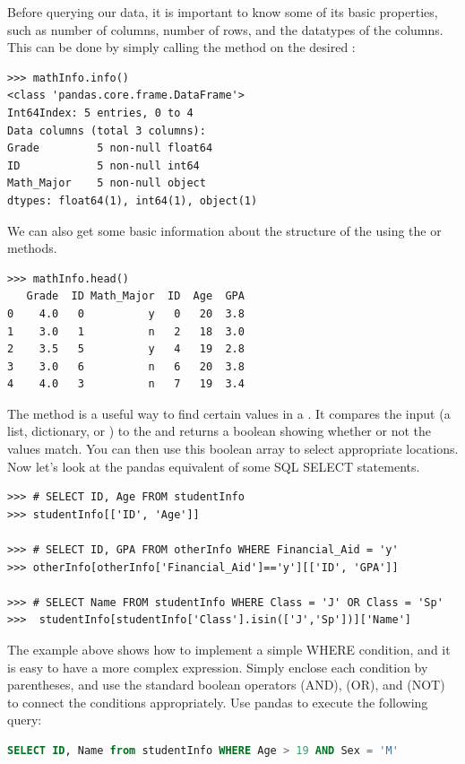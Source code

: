 Before querying our data, it is important to know some of its basic properties,
such as number of columns, number of rows, and the datatypes of the columns.
This can be done by simply calling the  method on the desired
:

\begin{lstlisting}
>>> mathInfo.info()
<class 'pandas.core.frame.DataFrame'>
Int64Index: 5 entries, 0 to 4
Data columns (total 3 columns):
Grade         5 non-null float64
ID            5 non-null int64
Math_Major    5 non-null object
dtypes: float64(1), int64(1), object(1)
\end{lstlisting}

We can also get some basic information about the structure of the 
using the  or  methods.

\begin{lstlisting}
>>> mathInfo.head()
   Grade  ID Math_Major  ID  Age  GPA
0    4.0   0          y   0   20  3.8
1    3.0   1          n   2   18  3.0
2    3.5   5          y   4   19  2.8
3    3.0   6          n   6   20  3.8
4    4.0   3          n   7   19  3.4
\end{lstlisting}

The method  is a useful way to find certain values in a
.  It compares the input (a list, dictionary, or )
to the  and returns a boolean  showing whether or
not the values match. You can then use this boolean array to select appropriate
locations. Now let's look at the pandas equivalent of some SQL SELECT statements.
\begin{lstlisting}
>>> # SELECT ID, Age FROM studentInfo
>>> studentInfo[['ID', 'Age']]

>>> # SELECT ID, GPA FROM otherInfo WHERE Financial_Aid = 'y'
>>> otherInfo[otherInfo['Financial_Aid']=='y'][['ID', 'GPA']]

>>> # SELECT Name FROM studentInfo WHERE Class = 'J' OR Class = 'Sp'
>>>  studentInfo[studentInfo['Class'].isin(['J','Sp'])]['Name']
\end{lstlisting}

\begin{problem}
The example above shows how to implement a simple WHERE condition, and it is easy
to have a more complex expression. Simply enclose each condition by parentheses,
and use the standard boolean operators \li{\&} (AND), \li{\|} (OR), and \li{\~} (NOT) to
connect the conditions appropriately. Use pandas to execute the following query:
\begin{lstlisting}[language=SQL]
SELECT ID, Name from studentInfo WHERE Age > 19 AND Sex = 'M'
\end{lstlisting}
\end{problem}

